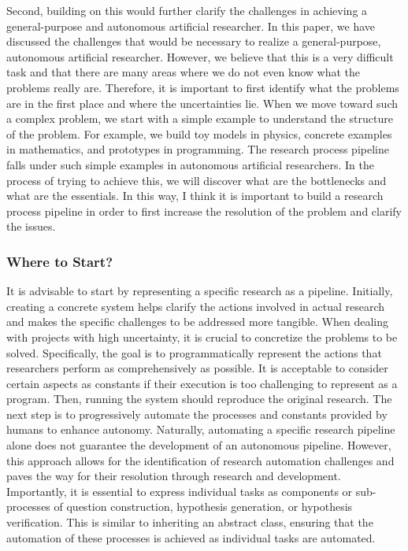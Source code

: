 Second, building on this would further clarify the challenges in achieving a general-purpose and autonomous artificial researcher. In this paper, we have discussed the challenges that would be necessary to realize a general-purpose, autonomous artificial researcher. However, we believe that this is a very difficult task and that there are many areas where we do not even know what the problems really are. Therefore, it is important to first identify what the problems are in the first place and where the uncertainties lie. When we move toward such a complex problem, we start with a simple example to understand the structure of the problem. For example, we build toy models in physics, concrete examples in mathematics, and prototypes in programming. The research process pipeline falls under such simple examples in autonomous artificial researchers. In the process of trying to achieve this, we will discover what are the bottlenecks and what are the essentials. In this way, I think it is important to build a research process pipeline in order to first increase the resolution of the problem and clarify the issues.

\subsubsection{Where to Start?}
It is advisable to start by representing a specific research as a pipeline. Initially, creating a concrete system helps clarify the actions involved in actual research and makes the specific challenges to be addressed more tangible. When dealing with projects with high uncertainty, it is crucial to concretize the problems to be solved. Specifically, the goal is to programmatically represent the actions that researchers perform as comprehensively as possible. It is acceptable to consider certain aspects as constants if their execution is too challenging to represent as a program. Then, running the system should reproduce the original research. The next step is to progressively automate the processes and constants provided by humans to enhance autonomy. Naturally, automating a specific research pipeline alone does not guarantee the development of an autonomous pipeline. However, this approach allows for the identification of research automation challenges and paves the way for their resolution through research and development. Importantly, it is essential to express individual tasks as components or sub-processes of question construction, hypothesis generation, or hypothesis verification. This is similar to inheriting an abstract class, ensuring that the automation of these processes is achieved as individual tasks are automated.

